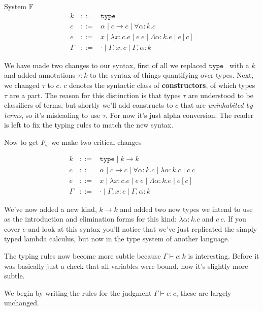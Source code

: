 \documentclass{amsart}
\newcommand{\type}{\ensuremath{\mathtt{type}}}
\begin{document}
\begin{section}{System F}
\[
\begin{array}{lcl}
  k & ::= & \type\\
  c & ::= & \alpha \mid c \to c \mid \forall \alpha : k. c\\
  e & ::= & x \mid \lambda x : c. e \mid e\ e \mid
            \Lambda \alpha : k. e \mid e[c]\\
  \Gamma & ::= & \cdot \mid \Gamma, x : c \mid \Gamma, \alpha : k
\end{array}
\]

We have made two changes to our syntax, first of all we replaced \type
\, with a $k$ and added annotations $\tau : k$ to the syntax of things
quantifying over types. Next, we changed $\tau$ to $c$. $c$ denotes the syntactic class of {\bf constructors}, of which types $\tau$ are a part. The reason for this distinction is that types $\tau$ are understood to be classifiers of terms, but shortly we'll add constructs to $c$ that are \emph{uninhabited by terms}, so it's misleading to use $\tau$. For now it's just alpha
conversion. The reader is left to fix the typing rules to match the
new syntax.

Now to get $F_\omega$ we make two critical changes

\[
\begin{array}{lcl}
  k & ::= & \type \mid k \to k\\
  c & ::= & \alpha \mid c \to c \mid \forall \alpha : k. c
            \mid \lambda \alpha : k. c \mid c\ c\\
  e & ::= & x \mid \lambda x : c. e \mid e\ e \mid
            \Lambda \alpha : k. e \mid e[c]\\
  \Gamma & ::= & \cdot \mid \Gamma, x : c \mid \Gamma, \alpha : k
\end{array}
\]

We've now added a new kind, $k \to k$ and added two new types we
intend to use as the introduction and elimination forms for this
kind: $\lambda \alpha : k. c$ and $c\ c$. If you cover $e$ and look at
this syntax you'll notice that we've just replicated the simply typed
lambda calculus, but now in the type system of another language.

The typing rules now become more subtle because $\Gamma \vdash c : k$
is interesting. Before it was basically just a check that all
variables were bound, now it's slightly more subtle.

We begin by writing the rules for the judgment $\Gamma \vdash e : c$,
these are largely unchanged.


\end{section}
\end{document}
